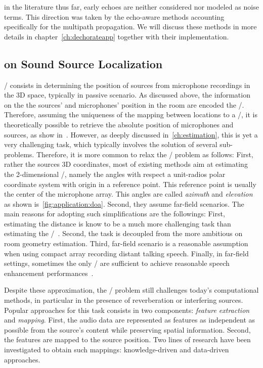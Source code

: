  in the literature thus far, early echoes are neither considered nor modeled as noise terms.
This direction was taken by the echo-aware methods accounting specifically for the multipath propagation.
We will discuss these methods in more details in chapter~\cref{ch:dechorateapp} together with their implementation.

\subsection{on Sound Source Localization}
\SSLdef/ consists in determining the position of sources from microphone recordings in the 3D space, typically in passive scenario.
As discussed above, the information on the the sources' and microphones' position in the room are encoded the \RIRs/.
Therefore, assuming the uniqueness of the mapping between locations to a \RIR/, it is theoretically possible to retrieve the absolute position of microphones and sources, as show in~.
However, as deeply discussed in~\cref{ch:estimation}, this is yet a very challenging task, which typically involves the solution of several sub-problems.
Therefore, it is more common to relax the \SSL/ problem as follows:
First, rather the sources 3D coordinates, most of existing methods aim at estimating the 2-dimensional \DOAdef/, namely the angles with respect a unit-radios polar coordinate system with origin in a reference point.
This reference point is usually the center of the microphone array.
This angles are called \textit{azimuth} and \textit{elevation} as shown is~\cref{fig:application:doa}.
Second, they assume far-field scenarios.
The main reasons for adopting such simplifications are the followings:
First, estimating the distance is know to be a much more challenging task than estimating the \DOAs/~.
Second, the task is decoupled from the more ambitious on room geometry estimation.
Third, far-field scenario is a reasonable assumption when using compact array recording distant talking speech.
Finally, in far-field settings, sometimes the only \DOAs/ are sufficient to achieve reasonable speech enhancement performances~.


\mynewline
Despite these approximation, the \SSL/ problem still challenges today's computational methods, in particular in the presence of reverberation or interfering sources.
Popular approaches for this task consists in two components: \textit{feature extraction} and \textit{mapping}.
First, the audio data are represented as features as independent as possible from the source's content while preserving spatial information.
Second, the features are mapped to the source position.
Two lines of research have been investigated to obtain such mappings: knowledge-driven and data-driven approaches.

